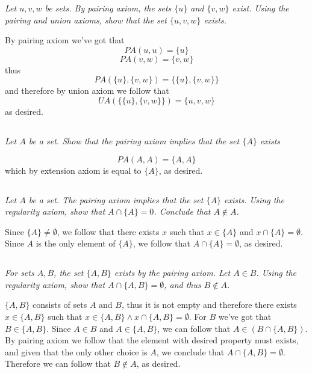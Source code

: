 \documentclass[11pt,oneside,titlepage]{book}
\begin{document}
\textit{Let $u, v, w$ be sets. By pairing axiom, the sets $\{u\}$ and $\{v, w\}$
  exist. Using the pairing and union axioms, show that the set $\{u, v, w\}$
  exists.}

By pairing axiom we've got that
$$PA(u, u) = \{u\}$$
$$PA(v, w) = \{v, w\}$$
thus
$$PA(\{u\}, \{v, w\}) = \{\{u\}, \{v, w\}\}$$
and therefore by union axiom we follow that
$$UA(\{\{u\}, \{v, w\}\}) = \{u, v, w\}$$
as desired.

\subsection{}

\textit{Let $A$ be a set. Show that the pairing axiom implies that the set $\{A\}$ exists}

$$PA(A, A) = \{A, A\}$$
which by extension axiom is equal to $\{A\}$, as desired.

\subsection{}

\textit{Let $A$ be a set. The pairing axiom implies that the set $\{A\}$ exists. Using the
  regularity axiom, show that $A \cap \{A\} = 0$. Conclude that $A \notin A$.}

Since $\{A\} \neq \emptyset$, we follow that there exists $x$ such that $x \in \{A\}$ and
$x \cap \{A\} = \emptyset$. Since $A$ is the only element of $\{A\}$, we follow that
$A \cap \{A\} = \emptyset$, as desired.

\subsection{}

\textit{For sets $A, B$, the set $\{A, B\}$ exists by the pairing axiom. Let $A \in B$.
  Using the regularity axiom, show that $A \cap \{A, B\} = \emptyset$, and thus $B \notin A$.}

$\{A, B\}$ consists of sets $A$ and $B$, thus it is not empty and therefore
there exists $x \in \{A, B\}$ such that $x \in \{A, B\} \land x \cap \{A, B\} = \emptyset$.
For $B$ we've got that $B \in \{A, B\}$. Since $A \in B$ and $A \in \{A, B\}$, we can follow that
$A \in (B \cap \{A, B\})$. By pairing axiom we follow that the element with desired
property must exists, and given that the only other choice is $A$,
we conclude that $A \cap \{A, B\} = \emptyset$. Therefore we can follow that $B \notin A$, as
desired.
\end{document}
